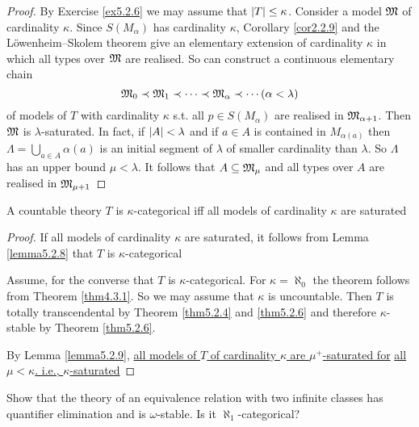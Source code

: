 \documentclass[11pt]{article}
\begin{document}
\begin{proof}
By Exercise \ref{ex5.2.6} we may assume that \(\abs{T}\le\kappa\).  Consider a model \(\mathfrak{M}\) of cardinality
\(\kappa\). Since \(S(M_\alpha)\) has cardinality \(\kappa\), Corollary \ref{cor2.2.9} and the Löwenheim–Skolem theorem
give an elementary extension of cardinality \(\kappa\) in which all types over \(\mathfrak{M}\) are realised. So can
construct a continuous elementary chain
\begin{equation*}
\mathfrak{M}_0\prec\mathfrak{M}_1\prec\dots\prec\mathfrak{M}_\alpha\prec\cdots(\alpha<\lambda)
\end{equation*}
of models of \(T\) with cardinality \(\kappa\) s.t. all \(p\in S(M_\alpha)\) are realised in \(\mathfrak{M}_{\alpha+1}\).
Then \(\mathfrak{M}\) is \(\lambda\)-saturated. In fact, if \(\abs{A}<\lambda\) and if \(a\in A\) is contained in \(M_{\alpha(a)}\)
then \(\Lambda=\bigcup_{a\in A}\alpha(a)\) is an initial segment of \(\lambda\) of smaller cardinality than \(\lambda\). So \(\Lambda\) has an
upper bound \(\mu<\lambda\). It follows that \(A\subseteq\mathfrak{M}_\mu\) and all types over \(A\) are realised in \(\mathfrak{M}_{\mu+1}\)
\end{proof}

\begin{theorem}[]
\label{thm5.2.11}
A countable theory \(T\) is \(\kappa\)-categorical iff all models of cardinality \(\kappa\) are saturated
\end{theorem}

\begin{proof}
If all models of cardinality \(\kappa\) are saturated, it follows from Lemma \ref{lemma5.2.8} that \(T\) is
\(\kappa\)-categorical

Assume, for the converse that \(T\) is \(\kappa\)-categorical. For \(\kappa=\aleph_0\) the theorem follows from
Theorem \ref{thm4.3.1}. So we may assume that \(\kappa\) is uncountable. Then \(T\) is totally
transcendental by Theorem \ref{thm5.2.4} and \ref{thm5.2.6} and therefore \(\kappa\)-stable by Theorem
\ref{thm5.2.6}.

By Lemma \ref{lemma5.2.9}, \uline{all models of \(T\) of cardinality \(\kappa\) are \(\mu^+\)-saturated for}
\uline{all \(\mu<\kappa\). i.e., \(\kappa\)-saturated}
\end{proof}



\begin{exercise}
\label{ex5.2.2}
Show that the theory of an equivalence relation with two infinite classes has quantifier
elimination and is \(\omega\)-stable. Is it \(\aleph_1\)-categorical?
\end{exercise}
\end{document}
